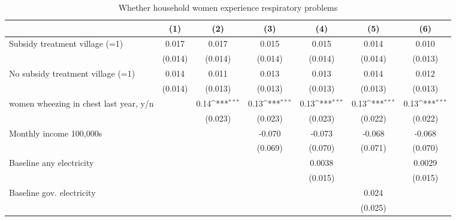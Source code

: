 \begin{table}[htbp]\centering
\def\sym#1{\ifmmode^{#1}\else\(^{#1}\)\fi}
\caption{Whether household women experience respiratory problems}
\begin{tabular*}{1\hsize}{@{\hskip\tabcolsep\extracolsep\fill}l*{6}{c}}
\toprule
                &\multicolumn{1}{c}{(1)}         &\multicolumn{1}{c}{(2)}         &\multicolumn{1}{c}{(3)}         &\multicolumn{1}{c}{(4)}         &\multicolumn{1}{c}{(5)}         &\multicolumn{1}{c}{(6)}         \\
\midrule
Subsidy treatment village (=1)&    0.017         &    0.017         &    0.015         &    0.015         &    0.014         &    0.010         \\
                &  (0.014)         &  (0.014)         &  (0.014)         &  (0.014)         &  (0.014)         &  (0.013)         \\
No subsidy treatment village (=1)&    0.014         &    0.011         &    0.013         &    0.013         &    0.014         &    0.012         \\
                &  (0.014)         &  (0.013)         &  (0.013)         &  (0.013)         &  (0.013)         &  (0.013)         \\
women wheezing in chest last year, y/n&                  &     0.14\sym{***}&     0.13\sym{***}&     0.13\sym{***}&     0.13\sym{***}&     0.13\sym{***}\\
                &                  &  (0.023)         &  (0.023)         &  (0.023)         &  (0.022)         &  (0.022)         \\
Monthly income 100,000s&                  &                  &   -0.070         &   -0.073         &   -0.068         &   -0.068         \\
                &                  &                  &  (0.069)         &  (0.070)         &  (0.071)         &  (0.070)         \\
Baseline any electricity&                  &                  &                  &   0.0038         &                  &   0.0029         \\
                &                  &                  &                  &  (0.015)         &                  &  (0.015)         \\
Baseline gov. electricity&                  &                  &                  &                  &    0.024         &                  \\
                &                  &                  &                  &                  &  (0.025)         &                  \\

\end{tabular*}
\end{table}
